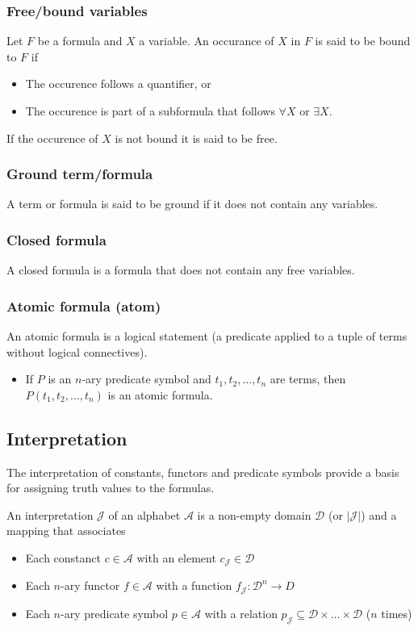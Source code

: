 \documentclass{article}
\begin{document}
\subsubsection{Free/bound variables}
Let $F$ be a formula and $X$ a variable. An occurance of $X$ in $F$ is said to be bound to $F$ if
\begin{itemize}
    \item The occurence follows a quantifier, or
    \item The occurence is part of a subformula that follows $\forall{X}$ or $\exists{X}$.
\end{itemize}
If the occurence of $X$ is not bound it is said to be free.

\subsubsection{Ground term/formula}
A term or formula is said to be ground if it does not contain any variables.

\subsubsection{Closed formula}
A closed formula is a formula that does not contain any free variables.

\subsubsection{Atomic formula (atom)}
An atomic formula is a logical statement (a predicate applied to a tuple of terms without logical connectives).
\begin{itemize} %
  \item If $P$ is an $n$-ary predicate symbol and $t_1, t_2, \ldots, t_n$ are terms, then $P(t_1,t_2,\ldots,t_n)$ is an atomic formula.
\end{itemize}



\subsection{Interpretation}
The interpretation of constants, functors and predicate symbols provide a basis for assigning truth values to the formulas.

An interpretation $\mathcal{J}$ of an alphabet $\mathcal{A}$ is a non-empty domain $\mathcal{D}$ (or $|\mathcal{J}|$) and a mapping that associates
\begin{itemize}
    \item Each constanct $c\in\mathcal{A}$ with an element $c_\mathcal{J}\in\mathcal{D}$
    \item Each $n$-ary functor $f\in\mathcal{A}$ with a function $f_\mathcal{J}:\mathcal{D}^n\rightarrow D$
    \item Each $n$-ary predicate symbol $p\in\mathcal{A}$ with a relation $p_\mathcal{J}\subseteq\mathcal{D}\times\ldots\times\mathcal{D}$ ($n$ times)
\end{itemize}
\end{document}
